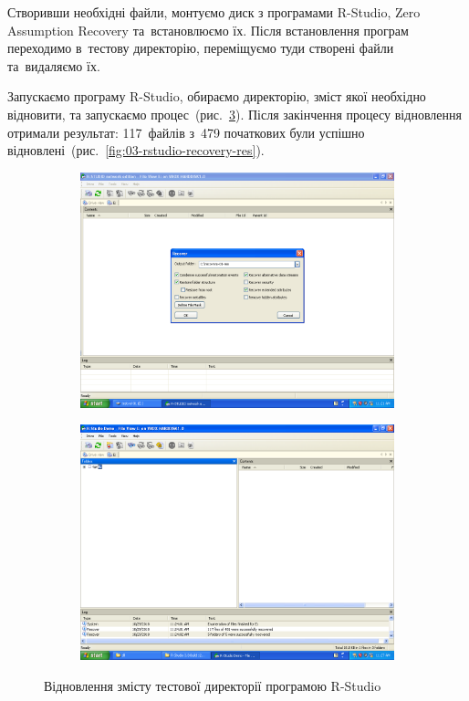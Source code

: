 \documentclass[
	a4paper,
	oneside,
	DIV = 12,
	fontsize = 13pt,
	headings = normal,
]{scrartcl}
\begin{document}
		Створивши необхідні файли, монтуємо диск з програмами \textenglish{R-Studio, Zero Assumption Recovery} та~встановлюємо їх. Після встановлення програм переходимо в~тестову директорію, переміщуємо туди створені файли та~видаляємо їх.

		Запускаємо програму \textenglish{R-Studio}, обираємо директорію, зміст якої необхідно відновити, та запускаємо процес~(рис.~\ref{fig:02-rstudio-recovery}). Після закінчення процесу відновлення отримали результат: 117~файлів з~479 початкових були успішно відновлені~(рис.~\ref{fig:03-rstudio-recovery-res}).

		 \begin{figure}[!htbp]
		 	\centering
		 	\begin{subfigure}{0.5\columnwidth}
		 		\centering
		 		\includegraphics[height = 9\baselineskip]{./assets/y03s01-pcdiag-lab-03-p05.png}
		 		\caption{}
		 		\label{subfig:02-01-rstudio-start}
		 	\end{subfigure}%
		 	\begin{subfigure}{0.5\columnwidth}
		 		\centering
		 		\includegraphics[height = 9\baselineskip]{./assets/y03s01-pcdiag-lab-03-p06.png}
		 		\caption{}
		 		\label{subfig:02-02-rstudio-res}
		 	\end{subfigure}
		 	\caption{Відновлення змісту тестової директорії програмою \textenglish{R-Studio}}
		 	\label{fig:02-rstudio-recovery}
		 \end{figure}
\end{document}

